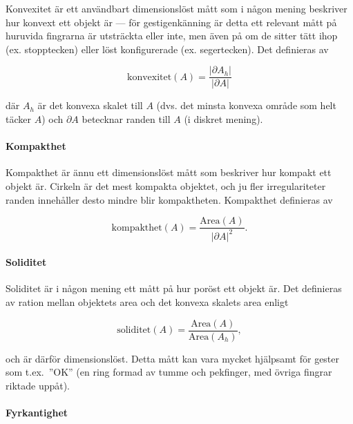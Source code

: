 \documentclass[../rapport_MVEX01-11-05]{subfiles}
\begin{document}
Konvexitet \cite[s.~26]{Rudemo09} är ett användbart dimensionslöst
mått som i någon mening beskriver hur konvext ett objekt är --- för
gestigenkänning är detta ett relevant mått på huruvida fingrarna är
utsträckta eller inte, men även på om de sitter tätt ihop (ex.
stopptecken) eller löst konfigurerade (ex. segertecken). Det
definieras av

\begin{equation*}
  \textrm{konvexitet}(A) = \frac{\left|\partial A_h\right|}{\left|\partial A\right|}
\end{equation*}

där $A_h$ är det konvexa skalet till $A$ (dvs. det minsta konvexa område som
helt täcker $A$) och $\partial A$ betecknar randen till $A$ (i diskret
mening).

\paragraph{Kompakthet}

Kompakthet \cite[s.~26]{Rudemo09} är ännu ett dimensionslöst mått som
beskriver hur kompakt ett objekt är.
Cirkeln är det mest kompakta objektet, och ju fler irregulariteter
randen innehåller desto mindre blir kompaktheten. Kompakthet
definieras av

\begin{equation*}
  \textrm{kompakthet}(A) = \frac{\textrm{Area}(A)}{\left|\partial
  A\right|^2}.
\end{equation*}

\paragraph{Soliditet}
\label{feat:soliditet}

Soliditet är i någon mening ett mått på hur poröst ett objekt är. Det
definieras av ration mellan objektets area och det konvexa skalets
area enligt

\begin{equation*}
  \textrm{soliditet}(A) = \frac{\textrm{Area}(A)}{\textrm{Area}(A_h)},
\end{equation*}

och är därför dimensionslöst. Detta mått kan vara mycket hjälpsamt för
gester som t.ex.~''OK'' (en ring formad av tumme och pekfinger, med
övriga fingrar riktade uppåt).

\paragraph{Fyrkantighet}
\label{feat:fyrkantighet}
\end{document}

